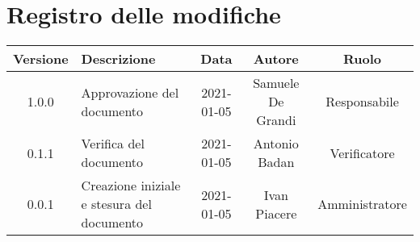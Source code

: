 \section*{Registro delle modifiche}

\begin{center}
	\begin{longtable}{|c|p{5cm}|c|c|c|}
	\hline
	\rowcolor{lighter-grayer}
	\textbf{Versione} & \textbf{Descrizione} & \textbf{Data} & \textbf{Autore} & \textbf{Ruolo} \\
	\hline
	\endfirsthead


	1.0.0 & Approvazione del documento & 2021-01-05 & Samuele De Grandi & Responsabile \\
	\hline
	0.1.1 & Verifica del documento & 2021-01-05 & Antonio Badan & Verificatore \\
	\hline
	0.0.1 & Creazione iniziale e stesura del documento & 2021-01-05 & Ivan Piacere & Amministratore \\
	\hline
	\end{longtable}
\end{center}